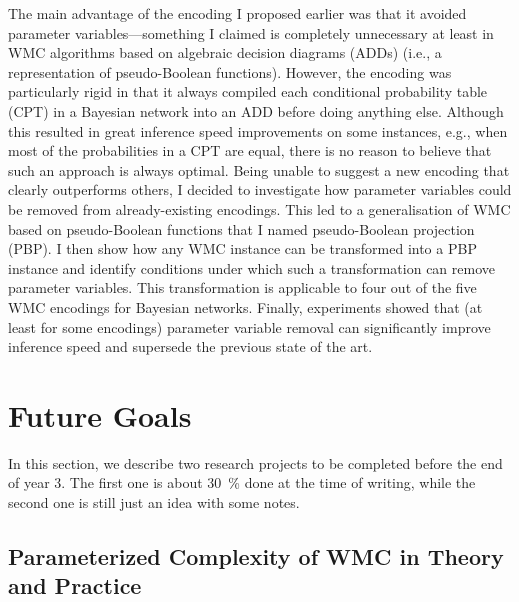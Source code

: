 \documentclass{article}
\begin{document}
\begin{description}
  The main advantage of the encoding I proposed earlier was that it avoided
  parameter variables---something I claimed is completely unnecessary at
  least in WMC algorithms based on algebraic decision diagrams (ADDs) (i.e., a
  representation of pseudo-Boolean functions). However, the encoding was
  particularly rigid in that it always compiled each conditional probability
  table (CPT) in a Bayesian network into an ADD before doing anything else.
  Although this resulted in great inference speed improvements on some
  instances, e.g., when most of the probabilities in a CPT are equal, there is
  no reason to believe that such an approach is always optimal. Being unable to
  suggest a new encoding that clearly outperforms others, I decided to
  investigate how parameter variables could be removed from already-existing
  encodings. This led to a generalisation of WMC based on pseudo-Boolean
  functions that I named pseudo-Boolean projection (PBP). I then show how any
  WMC instance can be transformed into a PBP instance and identify conditions
  under which such a transformation can remove parameter variables. This
  transformation is applicable to four out of the five WMC encodings for
  Bayesian networks. Finally, experiments showed that (at least for some
  encodings) parameter variable removal can significantly improve inference
  speed and supersede the previous state of the art.
\end{description}

\section{Future Goals} \label{sec:future}

In this section, we describe two research projects to be completed before the
end of year 3. The first one is about \SI{30}{\percent} done at the time of
writing, while the second one is still just an idea with some notes.

\subsection{Parameterized Complexity of WMC in Theory and
  Practice} \label{sec:1}
\end{document}
